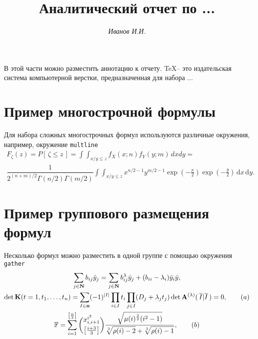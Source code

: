 \documentclass{article}
\begin{document}
\title{Аналитический отчет по ...} %
\author{\itshape Иванов И.И.} %
\date{} %
\maketitle %

\thispagestyle{fancy} %

В этой части можно разместить аннотацию к отчету. \TeX -- это издательская система компьютерной верстки, предназначенная для набора ...


\tableofcontents

\section{Пример многострочной формулы}
    Для набора сложных многострочных формул используются различные окружения, например, окружение \texttt{multline}
	\begin{multline}\label{eq:FunRasp}
		F_{\zeta}(z)=P[\,\zeta\leqslant z\,] = \int\!\!\!\int_{x/y\leqslant z}f_X(x;n)f_Y(y;m)\,dxdy =\\ \dfrac{1}{2^{(n+m)/2}\Gamma(n/2)\Gamma(m/2)}\int\!\!\!\int_{x/y\leqslant z}x^{n/2-1}y^{m/2-1}\exp\left( -\frac{x}{2} \right) \exp\left( -\frac{y}{2} \right) \,\mathrm{d}x \, \mathrm{d}y.
	\end{multline}

\section{Пример группового размещения формул}

Несколько формул можно разместить в одной группе с помощью окружения \texttt{gather}
\begin{gather}
	\sum_{j \in \mathbf{N}} b_{ij} \hat{y}_{j} = \sum_{j \in \mathbf{N}} b_{ij}^\lambda \hat{y}_j + (b_{ii} - \lambda_i)\hat{y}_i \hat{y},\notag \\
	\det \mathbf{K}(t=1, t_1, \ldots, t_n) = \sum_{I \in \mathbf{n} } (-1)^{|I|} \prod_{i \in I} t_i \prod_{j \in I} (D_j + \lambda_j t_j) \det \mathbf{A}^{(\lambda)} (\, \overline{I} | \overline{I} \,) = 0,\tag{$a$} \\
	\mathbb{F} = \sum_{i=1}^{\left[ \frac{n}{2}\right] } \binom{ x_{i,i+1}^{i^2}}{ \left[ \frac{i+3}{3} \right]} {{\sqrt{\mu(i)^\frac{3}{2} (i^2-1)}} \over\displaystyle {\sqrt[3]{\rho(i)-2} + \sqrt[3]{\rho(i)-1}} }, \tag{$b$}
\end{gather}
\end{document}
